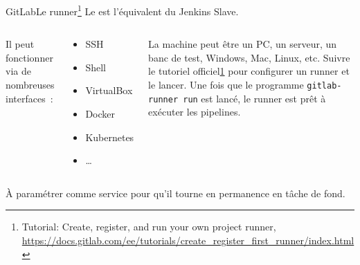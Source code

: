 \documentclass{beamer}
\begin{document}
    \begin{frame}{GitLab}{Le runner\footnote{\label{configrunner}Tutorial: Create, register, and run your own project runner, \url{https://docs.gitlab.com/ee/tutorials/create\_register\_first\_runner/index.html}}}
        \transdissolve
        Le  est l'équivalent du Jenkins Slave.
        \bigbreak
        \begin{columns}
            Il peut fonctionner via de nombreuses interfaces~:
            \begin{tiny}
                \begin{itemize}
                    \item SSH
                    \item Shell
                    \item VirtualBox
                    \item Docker
                    \item Kubernetes
                    \item \ldots
                \end{itemize}
            \end{tiny}
            La machine peut être un PC, un serveur, un banc de test, Windows, Mac, Linux, etc.
            \bigbreak
            Suivre le tutoriel officiel\cref{configrunner} pour configurer un runner et le lancer.
            Une fois que le programme \lstinline{gitlab-runner run} est lancé, le runner est prêt à exécuter les pipelines.
        \end{columns}
        \begin{dangercolorbox}
            À paramétrer comme service pour qu'il tourne en permanence en tâche de fond.
        \end{dangercolorbox}
    \end{frame}
\end{document}
